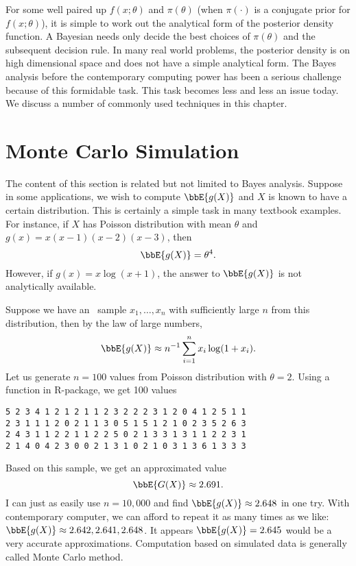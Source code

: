 For some well paired up $f(x; \theta)$ and $\pi(\theta)$ (when $\pi(\cdot)$ is
a conjugate prior for $f(x; \theta)$), it is
simple to work out the analytical form of the posterior density function.
A Bayesian needs only decide the best choices of $\pi(\theta)$ and the
subsequent decision rule. In many real world problems, the posterior
density is on high dimensional space and does not have a simple analytical
form. The Bayes analysis before the contemporary computing power has
been a serious challenge because of this formidable task. 
This task becomes less and less an issue today. 
We discuss a number of commonly used techniques
in this chapter.

\section{Monte Carlo Simulation}
The content of this section is related but not limited to
Bayes analysis. Suppose in some
applications, we wish to compute $\bbE\{ g(X)\}$ and $X$ is known
to have a certain distribution. This is certainly a simple task in many textbook
examples.
For instance, if $X$ has Poisson distribution with mean $\theta$
and $g(x) = x(x-1)(x-2)(x-3)$, then
\[
\bbE\{g(X)\} = \theta^4.
\]
However, if $g(x) = x \log (x+1)$, the answer
to $\bbE\{g(X)\}$ is not analytically available.

Suppose we have an \iid\ sample $x_1, \ldots, x_n$ with sufficiently
large $n$ from this distribution, then by the law of large numbers,
\[
\bbE\{g(X)\} \approx n^{-1} \sum_{i=1}^n x_i \log (1+x_i).
\]
Let us generate $n=100$ values from Poisson distribution with $\theta = 2$.
Using a function in R-package, we get 100 values
\begin{verbatim}
5 2 3 4 1 2 1 2 1 1 2 3 2 2 2 3 1 2 0 4 1 2 5 1 1 
2 3 1 1 1 2 0 2 1 1 3 0 5 1 5 1 2 1 0 2 3 5 2 6 3 
2 4 3 1 1 2 2 1 1 2 2 5 0 2 1 3 3 1 3 1 1 2 2 3 1 
2 1 4 0 4 2 3 0 0 2 1 3 1 0 2 1 0 3 1 3 6 1 3 3 3
\end{verbatim}
Based on this sample, we get an approximated value
\[
\bbE\{G(X)\} \approx 2.691.
\]
I can just as easily use $n=10,000$ and find
$\bbE\{g(X)\} \approx 2.648$ in one try. 
With contemporary computer, we can afford to repeat
it as many times as we like:
$\bbE\{g(X)\} \approx 2.642, 2.641, 2.648$. 
It appears $\bbE\{g(X)\} = 2.645$
would be a very accurate approximations.
Computation based on simulated data is generally called Monte
Carlo method.

